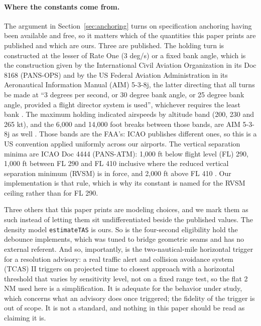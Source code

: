 \documentclass[12pt]{article}
\begin{document}
\paragraph{Where the constants come from.} The argument in
Section~\ref{sec:anchoring} turns on specification anchoring having been
available and free, so it matters which of the quantities this paper prints are
published and which are ours. Three are published. The holding turn is
constructed at the lesser of Rate One (3 deg/s) or a fixed bank angle, which is
the construction given by the International Civil Aviation Organization in its
Doc 8168 (PANS-OPS) \cite{skybraryhold} and by the US Federal Aviation
Administration in its Aeronautical Information Manual (AIM) 5-3-8j, the latter directing that all turns be made at ``3 degrees per
second, or 30 degree bank angle, or 25 degree bank angle, provided a flight
director system is used'', whichever requires the least bank \cite{faaaim2026}.
The maximum holding indicated airspeeds by altitude band (200, 230 and 265 kt),
and the 6{,}000 and 14{,}000 foot breaks between those bands, are AIM 5-3-8j as
well \cite{faaaim2026}. Those bands are the FAA's: ICAO publishes different ones,
so this is a US convention applied uniformly across our airports. The vertical
separation minima are ICAO Doc 4444 (PANS-ATM): 1{,}000 ft below flight level
(FL) 290,
1{,}000 ft between FL 290 and FL 410 inclusive where the reduced vertical
separation minimum (RVSM) is in force, and
2{,}000 ft above FL 410 \cite{icaorvsm2002}. Our implementation is that rule,
which is why its constant is named for the RVSM ceiling rather than for FL 290.

Three others that this paper prints are modeling choices, and we mark them as such instead of letting them sit undifferentiated beside the
published values. The density model \texttt{estimateTAS} is ours. So is the
four-second eligibility hold the debounce implements, which was tuned to bridge
geometric seams and has no external referent. And so, importantly, is the
two-nautical-mile horizontal trigger for a resolution advisory: a real traffic
alert and collision avoidance system (TCAS) II
triggers on projected time to closest approach with a horizontal threshold that
varies by sensitivity level, not on a fixed range test, so the flat 2 NM used here
is a simplification. It is adequate for the behavior under study, which concerns what an advisory does
once triggered; the fidelity of the trigger is out of scope. It is not a standard,
and nothing in this paper should be read as claiming it is.
\end{document}
